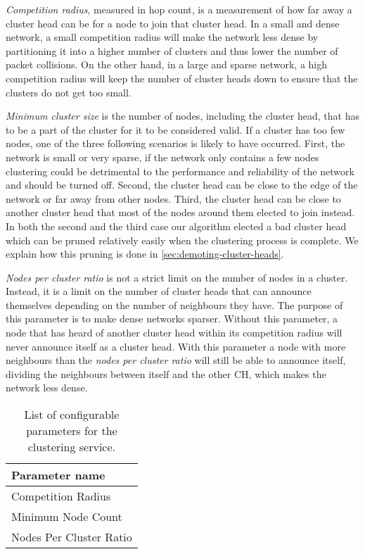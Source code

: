 \emph{Competition radius}, measured in hop count, is a measurement of how far away a cluster head can be for a node to join that cluster head. In a small and dense network, a small competition radius will make the network less dense by partitioning it into a higher number of clusters and thus lower the number of packet collisions. On the other hand, in a large and sparse network, a high competition radius will keep the number of cluster heads down to ensure that the clusters do not get too small. 


\emph{Minimum cluster size} is the number of nodes, including the cluster head, that has to be a part of the cluster for it to be considered valid. If a cluster has too few nodes, one of the three following scenarios is likely to have occurred. First, the network is small or very sparse, if the network only contains a few nodes clustering could be detrimental to the performance and reliability of the network and should be turned off. Second, the cluster head can be close to the edge of the network or far away from other nodes. Third, the cluster head can be close to another cluster head that most of the nodes around them elected to join instead. In both the second and the third case our algorithm elected a bad cluster head which can be pruned relatively easily when the clustering process is complete. We explain how this pruning is done in \cref{sec:demoting-cluster-heads}.


\emph{Nodes per cluster ratio} is not a strict limit on the number of nodes in a cluster. Instead, it is a limit on the number of cluster heads that can announce themselves depending on the number of neighbours they have. The purpose of this parameter is to make dense networks sparser. Without this parameter, a node that has heard of another cluster head within its competition radius will never announce itself as a cluster head. With this parameter a node with more neighbours than the \emph{nodes per cluster ratio} will still be able to announce itself, dividing the neighbours between itself and the other CH, which makes the network less dense.

\begin{table}[bt]
\centering
\caption{List of configurable parameters for the clustering service.}
\label{table:configuration-parameters}
\begin{tabular}{l}
\textbf{Parameter name}      \\ \hline
Competition Radius      \\
Minimum Node Count      \\
Nodes Per Cluster Ratio
\end{tabular}
\end{table}

